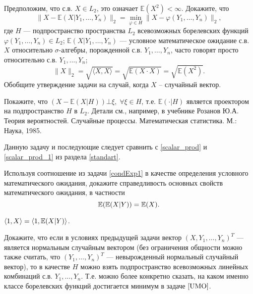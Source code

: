 \begin{problem}
\label{condExp1}
Предположим, что с.в. $X\in L_2$, это означает ${\mathbb E}(X^2)<\infty$. Докажите, что 
\begin{equation*}
\label{UMO}
\| X-{\mathbb E}(X|Y_1,\ldots,Y_n)\|_{2}=\min\limits_{\varphi\in H} \| X-\varphi(Y_1,\ldots,Y_n)\|_{2} , 
\end{equation*}
где $H$ --- подпространство пространства $L_2$ всевозможных борелевских функций $\varphi(Y_1,\ldots,Y_n)\in L_2$; 
${\mathbb E}(X|Y_1,\ldots,Y_n)$ --- условное математическое ожидание с.в. $X$ относительно $\sigma$-алгебры, порожденной с.в. 
$Y_1,\ldots,Y_n$, часто говорят просто относительно с.в. $Y_1,\ldots,Y_n$; 
$$
\| X\|_{2}=\sqrt{\langle X,X\rangle}=\sqrt{{\mathbb E}(X\cdot X)}=\sqrt{{\mathbb E}(X^2)} . 
$$
Обобщите утверждение задачи на случай, когда $X$ -- случайный вектор.
\end{problem}


\begin{ordre}
Покажите, что $(X-{\mathbb E}(X|H)) \bot \xi,\; \forall\xi\in H$, т.е. ${\mathbb E}(\cdot|H)$ 
является проектором на подпространство $H$ в $L_2$. Детали см., например, в учебнике Розанов Ю.А. Теория вероятностей. Случайные процессы. Математическая статистика. М.: Наука, 1985.
\end{ordre}

\begin{remark}
Данную задачу и последующие следует сравнить с \ref{scalar_prod} и \ref{scalar_prod_1} 
из раздела \ref{standart}.
\end{remark}

\begin{problem}
Используя соотношение из задачи \ref{condExp1}  в качестве определения условного математического ожидания, докажите справедливость основных свойств математического ожидания, в частности
\[
\mathrm{{\mathbb E}}(\mathrm{{\mathbb E}}(X|Y)) = \mathrm{{\mathbb E}}(X). 
\]
\end{problem}

\begin{ordre}
$\langle 1, X \rangle = \langle 1, \mathrm{{\mathbb E}}(X|Y) \rangle$.
\end{ordre}


\begin{problem}
\label{condExp3}
Докажите, что если в условиях предыдущей задачи вектор $(X,Y_1,\ldots,Y_n)^T$ --- является нормальным случайным вектором (без ограничения 
общности можно также считать, что $(Y_1,\ldots,Y_n)^T$  --- невырожденный нормальный случайный вектор), то в качестве $H$ можно взять 
подпространство всевозможных линейных комбинаций с.в. $Y_1,\ldots,Y_n$. Т.е. можно более конкретно сказать, на каком именно 
классе борелевских функций достигается минимум в задаче $\ref{UMO}$. 
\end{problem}

